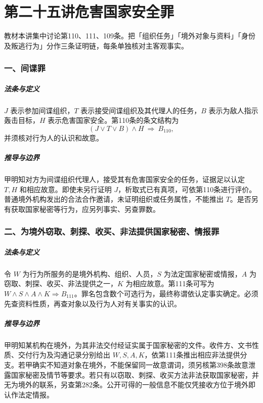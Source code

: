 \chapter{第二十五讲\quad 危害国家安全罪}
\label{lecture:25}
\par

教材本讲集中讨论第110、111、109条。把「组织任务」「境外对象与资料」「身份及叛逃行为」分作三条证明链，每条单独核对主客观事实。

\subsection*{一、间谍罪}

\paragraph{法条与定义}
\(J\) 表示参加间谍组织，\(T\) 表示接受间谍组织及其代理人的任务，\(B\) 表示为敌人指示轰击目标，\(H\) 表示危害国家安全。第110条的条文结构为
\[
(J\lor T\lor B)\land H\ \Longrightarrow\ B_{110},
\]
并须核对行为人的认识和故意。

\paragraph{推导与边界}
甲明知对方为间谍组织代理人，接受其有危害国家安全的任务，证据足以认定 \(T,H\) 和相应故意。即使未另行证明 \(J\)，析取式已有真项，可依第110条进行评价。普通境外机构发出的合法合作邀请，未证明组织或任务属性，不能推出 \(T\)。是否另有获取国家秘密等行为，应另列事实、另查罪数。

\subsection*{二、为境外窃取、刺探、收买、非法提供国家秘密、情报罪}

\paragraph{法条与定义}
令 \(W\) 为行为所服务的是境外机构、组织、人员，\(S\) 为法定国家秘密或情报，\(A\) 为窃取、刺探、收买、非法提供之一，\(K\) 为相应故意。第111条可写为 \(W\land S\land A\land K\Rightarrow B_{111}\)。罪名包含数个可选行为，最终称谓依认定事实确定。必须先查资料性质，再查对象以及行为人对有关事实的认识。

\paragraph{推导与边界}
甲明知某机构在境外，为其非法交付经证实属于国家秘密的文件。收件方、文书性质、交付行为及沟通记录分别给出 \(W,S,A,K\)，依第111条推出相应非法提供分支。若甲确实不知道对象在境外，不能保留同一故意谓词，须另核第398条故意泄露国家秘密及情节等要求。若只有以窃取、刺探、收买方法非法获取国家秘密，并无为境外的联系，另查第282条。公开可得的一般信息不能仅凭接收方位于境外即认作法定情报。

